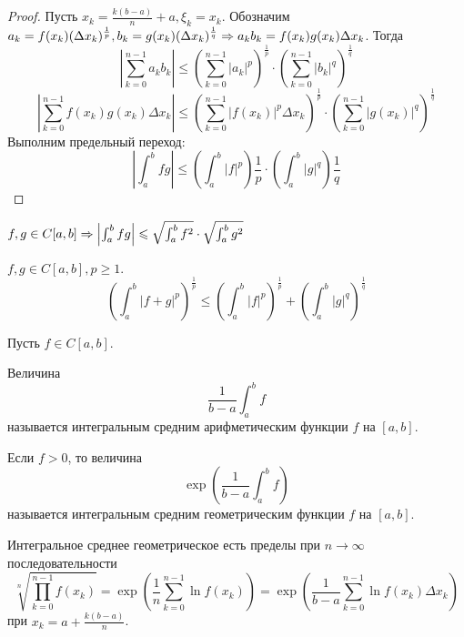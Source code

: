 \begin{proof}
	Пусть $x_k = \frac{k(b - a)}{n} + a, \xi_k = x_k$.
	Обозначим $a_k = f(x_k) (\Delta x_k)^{\frac{1}{p}}, b_k = g(x_k) (\Delta x_k)^{\frac{1}{q}} \Rightarrow a_k b_k = f(x_k) g(x_k) \Delta x_k$. Тогда
	\[\left| \sum_{k=0}^{n - 1} a_k b_k \right| \leqslant \left(\sum_{k=0}^{n - 1} |a_k|^p\right)^{\frac{1}{p}} \cdot \left(\sum_{k = 0}^{n - 1}|b_k|^q\right)^{\frac{1}{q}}\]
	\[\left| \sum_{k=0}^{n - 1} f(x_k)g(x_k) \Delta x_k \right| \leqslant \left(\sum_{k = 0}^{n - 1} |f(x_k)|^p \Delta x_k\right)^{\frac{1}{p}} \cdot \left(\sum_{k = 0}^{n - 1}|g(x_k)|^q\right)^{\frac{1}{q}}\]
	Выполним предельный переход:
	\[\left|\int_a^b fg\right| \leqslant \left(\int_a^b |f|^p\right)\frac{1}{p} \cdot \left(\int_a^b |g|^q\right)\frac{1}{q}\] 	
\end{proof}

\begin{Cons}
	$f, g \in C[a, b] \Rightarrow \left|\int_a^b fg\right| \leqslant \sqrt{\int_a^b f^2} \cdot \sqrt{\int_a^b g^2}$ 
\end{Cons}

\begin{Thm}
	$f, g \in C[a, b], p \geqslant 1$.
	\[\left(\int_a^b |f + g|^p\right)^{\frac{1}{p}} \leqslant \left(\int_a^b |f|^p\right)^{\frac{1}{p}} + \left(\int_a^b |g|^q\right)^{\frac{1}{q}}\] 
\end{Thm}

\begin{Def}
	Пусть $f \in C[a, b]$.
	\begin{MyList}
		\item Величина
		\[\frac{1}{b - a}\int_a^b f\]
		называется интегральным средним арифметическим функции $f$ на $[a, b]$.

		\item Если $f > 0$, то величина
		\[\exp \left(\frac{1}{b - a}\int_a^b f\right)\]
		называется интегральным средним геометрическим функции $f$ на $[a, b]$.
	\end{MyList}
\end{Def}

\begin{Rem}
	Интегральное среднее геометрическое есть пределы при $n \to \infty$ последовательности
	\[\sqrt[n]{\prod_{k = 0}^{n - 1} f(x_k)} = \exp \left(\frac{1}{n} \sum_{k = 0}^{n - 1} \ln f(x_k)\right) = \exp \left(\frac{1}{b - a} \sum_{k = 0}^{n - 1} \ln f(x_k) \Delta x_k\right)\]
	при $x_k = a + \frac{k(b - a)}{n}$.  
\end{Rem}

